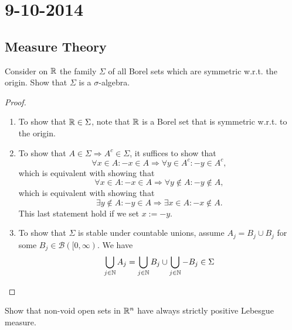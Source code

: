 \section{9-10-2014}

\subsection{Measure Theory}
\begin{thm}[Problem 6.1a]
Consider on \(\Bbb{R}\) the family \(\Sigma \) of all Borel sets which are symmetric w.r.t. the origin. Show that \(\Sigma \) is a \(\sigma \)-algebra.
\end{thm}

\begin{proof}

\begin{enumerate}
  \item To show that \(\Bbb{R}\in \Sigma \), note that \(\Bbb{R}\) is a Borel set that is symmetric w.r.t. to the origin.
  \item To show that \(A\in \Sigma \Rightarrow A^c\in \Sigma \), it suffices to show that
\[
\forall x\in A:-x\in A \Longrightarrow  \forall y\in A^c:-y\in A^c,
\]
which is equivalent with showing that
\[
\forall x\in A:-x\in A \Longrightarrow \forall y\not\in A : -y\not\in A,
\]
which is equivalent with showing that
\[
\exists y\not\in A:-y\in A \Longrightarrow \exists x\in A:-x\not\in A.
\]
This last statement hold if we set \(x:=-y.\)
  \item To show that \(\Sigma \) is stable under countable unions, assume \(A_{j}=B_{j}\cup B_{j}\) for some \(B_{j}\in \mathcal{B}([0,\infty )\). We have
\[
\bigcup _{j\in \Bbb{N}}A_{j}=\bigcup _{j\in \Bbb{N}}B_{j}\cup \bigcup _{j\in \Bbb{N}}-B_{j}\in \Sigma 
\]
\end{enumerate}
\end{proof}
%

\newpage
\begin{thm}[Problem 6.3i]
Show that non-void open sets in \(\Bbb{R}^n\) have always strictly positive Lebesgue measure.
\end{thm}

